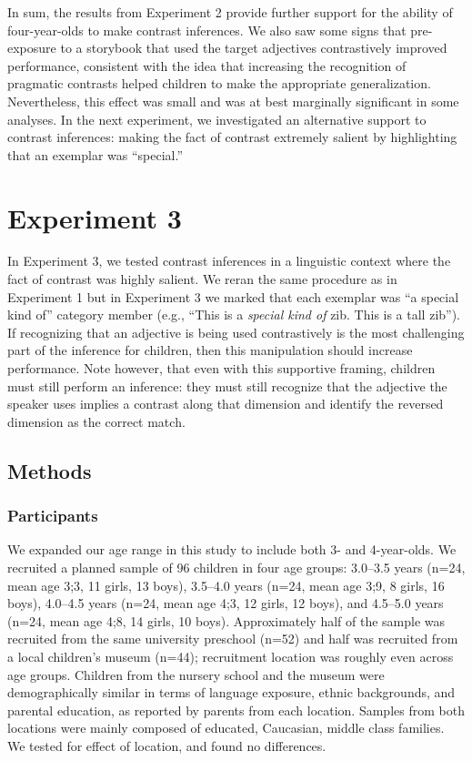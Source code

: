 \documentclass[man]{apa2}
\begin{document}
In sum, the results from Experiment 2 provide further support for the ability of four-year-olds to make contrast inferences. We also saw some signs that pre-exposure to a storybook that used the target adjectives contrastively improved performance, consistent with the idea that increasing the recognition of pragmatic contrasts helped children to make the appropriate generalization. Nevertheless, this effect was small and was at best marginally significant in some analyses. In the next experiment, we investigated an alternative support to contrast inferences: making the fact of contrast extremely salient by highlighting that an exemplar was ``special.''

\section{Experiment 3}

In Experiment 3, we tested contrast inferences in a linguistic context where the fact of contrast was highly salient. We reran the same procedure as in Experiment 1 but in Experiment 3 we marked that each exemplar was ``a special kind of'' category member (e.g., ``This is a \emph{special kind of} zib. This is a tall zib''). If recognizing that an adjective is being used contrastively is the most challenging part of the inference for children, then this manipulation should increase performance. Note however, that even with this supportive framing, children must still perform an inference: they must still recognize that the adjective the speaker uses implies a contrast along that dimension and identify the reversed dimension as the correct match.

\subsection{Methods}

\subsubsection{Participants}

We expanded our age range in this study to include both 3- and 4-year-olds. We recruited a planned sample of 96 children in four age groups: 3.0--3.5 years (n=24, mean age 3;3, 11 girls, 13 boys), 3.5--4.0 years (n=24, mean age 3;9, 8 girls, 16 boys), 4.0--4.5 years (n=24, mean age 4;3, 12 girls, 12 boys), and 4.5--5.0 years (n=24, mean age 4;8, 14 girls, 10 boys).  Approximately half of the sample was recruited from the same university preschool (n=52) and half was recruited from a local children's museum (n=44); recruitment location was roughly even across age groups. Children from the nursery school and the museum were demographically similar in terms of language exposure, ethnic backgrounds, and parental education, as reported by parents from each location. Samples from both locations were mainly composed of educated, Caucasian, middle class families. We tested for effect of location, and found no differences.
\end{document}
